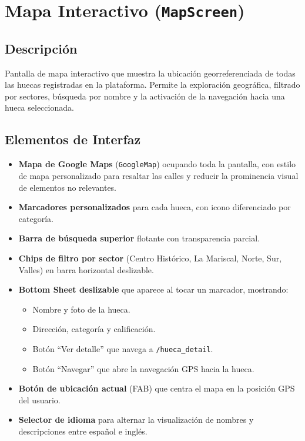 \documentclass[11pt, a4paper, oneside]{report}
\begin{document}
\section{Mapa Interactivo (\texttt{MapScreen})}

\subsection{Descripción}
Pantalla de mapa interactivo que muestra la ubicación georreferenciada de todas las huecas registradas en la plataforma. Permite la exploración geográfica, filtrado por sectores, búsqueda por nombre y la activación de la navegación hacia una hueca seleccionada.

\subsection{Elementos de Interfaz}
\begin{itemize}
  \item \textbf{Mapa de Google Maps} (\texttt{GoogleMap}) ocupando toda la pantalla, con estilo de mapa personalizado para resaltar las calles y reducir la prominencia visual de elementos no relevantes.
  \item \textbf{Marcadores personalizados} para cada hueca, con icono diferenciado por categoría.
  \item \textbf{Barra de búsqueda superior} flotante con transparencia parcial.
  \item \textbf{Chips de filtro por sector} (Centro Histórico, La Mariscal, Norte, Sur, Valles) en barra horizontal deslizable.
  \item \textbf{Bottom Sheet deslizable} que aparece al tocar un marcador, mostrando:
  \begin{itemize}
    \item Nombre y foto de la hueca.
    \item Dirección, categoría y calificación.
    \item Botón ``Ver detalle'' que navega a \texttt{/hueca\_detail}.
    \item Botón ``Navegar'' que abre la navegación GPS hacia la hueca.
  \end{itemize}
  \item \textbf{Botón de ubicación actual} (FAB) que centra el mapa en la posición GPS del usuario.
  \item \textbf{Selector de idioma} para alternar la visualización de nombres y descripciones entre español e inglés.
\end{itemize}
\end{document}
